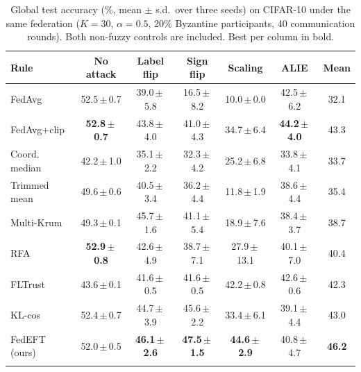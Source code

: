 \begin{table}[t]
\centering
\caption{Global test accuracy (\%, mean $\pm$ s.d.\ over three seeds) on CIFAR-10 under the same federation ($K=30$, $\alpha=0.5$, 20\% Byzantine participants, 40 communication rounds). Both non-fuzzy controls are included. Best per column in bold.}
\label{tab:main_cifar}
\setlength{\tabcolsep}{4.0pt}
\footnotesize
\begin{tabular}{@{}lcccccc@{}}
\toprule
Rule & No attack & Label flip & Sign flip & Scaling & ALIE & \textbf{Mean}\\
\midrule
FedAvg & 52.5\,$\pm$\,0.7 & 39.0\,$\pm$\,5.8 & 16.5\,$\pm$\,8.2 & 10.0\,$\pm$\,0.0 & 42.5\,$\pm$\,6.2 & 32.1\\
FedAvg+clip & \textbf{52.8\,$\pm$\,0.7} & 43.8\,$\pm$\,4.0 & 41.0\,$\pm$\,4.3 & 34.7\,$\pm$\,6.4 & \textbf{44.2\,$\pm$\,4.0} & 43.3\\
Coord. median & 42.2\,$\pm$\,1.0 & 35.1\,$\pm$\,2.2 & 32.3\,$\pm$\,4.2 & 25.2\,$\pm$\,6.8 & 33.8\,$\pm$\,4.1 & 33.7\\
Trimmed mean & 49.6\,$\pm$\,0.6 & 40.5\,$\pm$\,3.4 & 36.2\,$\pm$\,4.4 & 11.8\,$\pm$\,1.9 & 38.6\,$\pm$\,4.4 & 35.4\\
Multi-Krum & 49.3\,$\pm$\,0.1 & 45.7\,$\pm$\,1.6 & 41.1\,$\pm$\,5.4 & 18.9\,$\pm$\,7.6 & 38.4\,$\pm$\,3.7 & 38.7\\
RFA & \textbf{52.9\,$\pm$\,0.8} & 42.6\,$\pm$\,4.9 & 38.7\,$\pm$\,7.1 & 27.9\,$\pm$\,13.1 & 40.1\,$\pm$\,7.0 & 40.4\\
FLTrust & 43.6\,$\pm$\,0.1 & 41.6\,$\pm$\,0.5 & 41.6\,$\pm$\,0.5 & 42.2\,$\pm$\,0.8 & 42.6\,$\pm$\,0.6 & 42.3\\
KL-cos & 52.4\,$\pm$\,0.7 & 44.7\,$\pm$\,3.9 & 45.6\,$\pm$\,2.2 & 33.4\,$\pm$\,6.1 & 39.1\,$\pm$\,4.4 & 43.0\\
\midrule
FedEFT (ours) & 52.0\,$\pm$\,0.5 & \textbf{46.1\,$\pm$\,2.6} & \textbf{47.5\,$\pm$\,1.5} & \textbf{44.6\,$\pm$\,2.9} & 40.8\,$\pm$\,4.7 & \textbf{46.2}\\
\botrule
\end{tabular}
\end{table}
